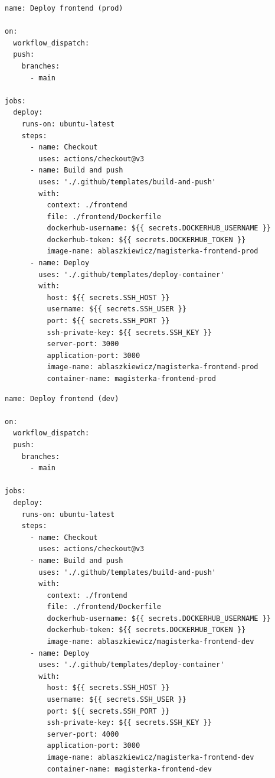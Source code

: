 \documentclass{article}
\begin{document}
\begin{lstlisting}[caption=Plik \texttt{.github/workflows/prod-deploy-frontend.yml}]
name: Deploy frontend (prod)

on:
  workflow_dispatch:
  push:
    branches:
      - main

jobs:
  deploy:
    runs-on: ubuntu-latest
    steps:
      - name: Checkout
        uses: actions/checkout@v3
      - name: Build and push
        uses: './.github/templates/build-and-push'
        with:
          context: ./frontend
          file: ./frontend/Dockerfile
          dockerhub-username: ${{ secrets.DOCKERHUB_USERNAME }}
          dockerhub-token: ${{ secrets.DOCKERHUB_TOKEN }}
          image-name: ablaszkiewicz/magisterka-frontend-prod
      - name: Deploy
        uses: './.github/templates/deploy-container'
        with:
          host: ${{ secrets.SSH_HOST }}
          username: ${{ secrets.SSH_USER }}
          port: ${{ secrets.SSH_PORT }}
          ssh-private-key: ${{ secrets.SSH_KEY }}
          server-port: 3000
          application-port: 3000
          image-name: ablaszkiewicz/magisterka-frontend-prod
          container-name: magisterka-frontend-prod

\end{lstlisting}

\begin{lstlisting}[caption=Plik \texttt{.github/workflows/dev-deploy-frontend.yml}]
name: Deploy frontend (dev)

on:
  workflow_dispatch:
  push:
    branches:
      - main

jobs:
  deploy:
    runs-on: ubuntu-latest
    steps:
      - name: Checkout
        uses: actions/checkout@v3
      - name: Build and push
        uses: './.github/templates/build-and-push'
        with:
          context: ./frontend
          file: ./frontend/Dockerfile
          dockerhub-username: ${{ secrets.DOCKERHUB_USERNAME }}
          dockerhub-token: ${{ secrets.DOCKERHUB_TOKEN }}
          image-name: ablaszkiewicz/magisterka-frontend-dev
      - name: Deploy
        uses: './.github/templates/deploy-container'
        with:
          host: ${{ secrets.SSH_HOST }}
          username: ${{ secrets.SSH_USER }}
          port: ${{ secrets.SSH_PORT }}
          ssh-private-key: ${{ secrets.SSH_KEY }}
          server-port: 4000
          application-port: 3000
          image-name: ablaszkiewicz/magisterka-frontend-dev
          container-name: magisterka-frontend-dev

\end{lstlisting}
\end{document}
